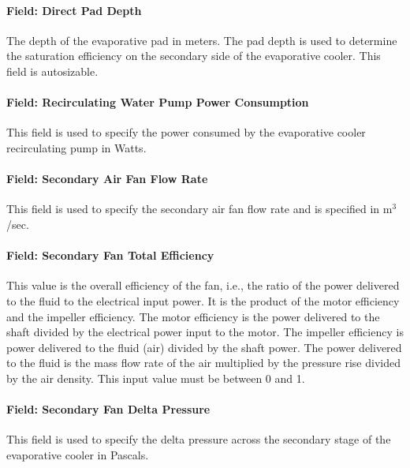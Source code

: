 \paragraph{Field: Direct Pad Depth}\label{field-direct-pad-depth-1}

The depth of the evaporative pad in meters. The pad depth is used to determine the saturation efficiency on the secondary side of the evaporative cooler. This field is autosizable.

\paragraph{Field: Recirculating Water Pump Power Consumption}\label{field-recirculating-water-pump-power-consumption-1}

This field is used to specify the power consumed by the evaporative cooler recirculating pump in Watts.

\paragraph{Field: Secondary Air Fan Flow Rate}\label{field-secondary-air-fan-flow-rate}

This field is used to specify the secondary air fan flow rate and is specified in m\(^{3}\)/sec.

\paragraph{Field: Secondary Fan Total Efficiency}\label{field-secondary-fan-total-efficiency}

This value is the overall efficiency of the fan, i.e., the ratio of the power delivered to the fluid to the electrical input power. It is the product of the motor efficiency and the impeller efficiency. The motor efficiency is the power delivered to the shaft divided by the electrical power input to the motor. The impeller efficiency is power delivered to the fluid (air) divided by the shaft power. The power delivered to the fluid is the mass flow rate of the air multiplied by the pressure rise divided by the air density. This input value must be between 0 and 1.

\paragraph{Field: Secondary Fan Delta Pressure}\label{field-secondary-fan-delta-pressure}

This field is used to specify the delta pressure across the secondary stage of the evaporative cooler in Pascals.

